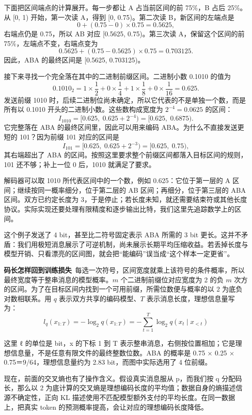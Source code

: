 下面把区间端点的计算展开。每一步都让 A 占当前区间的前 75\%，B 占后 25\%。从 {[}0, 1) 开始，第一次读 A，得到 {[}0, 0.75)。第二次读 B，新区间的左端点是
\[
0 + (0.75 - 0)\times 0.75 = 0.5625,
\]
右端点仍是 0.75，所以 AB 对应 {[}0.5625, 0.75)。第三次读 A，保留这个区间的前 75\%，左端点不变，右端点变为
\[
0.5625 + (0.75 - 0.5625)\times 0.75 = 0.703125.
\]
因此，ABA 的最终区间是 {[}0.5625, 0.703125)。

接下来寻找一个完全落在其中的二进制前缀区间。二进制小数 0.1010 的值为
\[
0.1010_2 = 1\times\frac{1}{2} + 0\times\frac{1}{4}
+ 1\times\frac{1}{8} + 0\times\frac{1}{16} = 0.625.
\]
发送前缀 1010 时，后续二进制位尚未确定，所以它代表的不是单独一个数，而是所有以 0.1010 开头的二进制小数。这些数构成宽度为 \(2^{-4}=0.0625\) 的区间：
\[
I_{1010} = [0.625,\;0.625+2^{-4}) = [0.625,\;0.6875).
\]
它完整落在 ABA 的最终区间里，因此可以用来编码 ABA。为什么不直接发送更短的 101？因为前缀 101 对应的区间是
\[
I_{101} = [0.625,\;0.625+2^{-3}) = [0.625,\;0.75),
\]
其右端超出了 ABA 的区间。按照这里要求整个前缀区间都落入目标区间的规则，101 还不够；补上一位 0 后，1010 就满足了要求。

解码器可以取 1010 所代表区间中的一个数，例如 0.625：它位于第一层的 A 区间；继续按同一概率细分，位于第二层的 AB 区间；再细分，位于第三层的 ABA 区间。双方已约定长度为 3，于是停止；若长度未知，就还需要结束符或其他长度协议。实际实现还要处理有限精度和逐步输出比特，我们这里先追踪数学上的区间。

这个例子发送了 4 bit，甚至比二符号固定表示 ABA 所需的 3 bit 更长。这并不矛盾：我们用极短消息展示了可逆机制，尚未展示长期平均压缩收益。若丢掉长度与模型开销、只看漂亮的区间图，就会把``能编码''误当成``这个样本一定更省''。

\textbf{码长怎样回到训练损失}~每选一次符号，区间宽度就乘上该符号的条件概率，所以最终宽度等于整串消息的模型概率。\(m\) 个二进制前缀位对应宽度为 2 的负 \(m\) 次方的区间。为了在目标区间内找到一个可用前缀，所需位数便与概率的以 2 为底负对数相联系。用 \(q\) 表示双方共享的编码模型、\(T\) 表示消息长度，理想信息量写为：
\[l_{q}\left( x_{1:T} \right) = - \log_{2}q\left( x_{1:T} \right) = - \sum_{t = 1}^{T}\log_{2}q\left( x_{t} \mid x_{< t} \right)\]

这里 ℓ 的单位是 bit，x 的下标 1 到 T 表示整串消息，右侧按位置相加；它是理想信息量，不是任意有限文件的最终整数位数。ABA 的概率是 0.75 × 0.25 × 0.75＝9/64，理想信息量约为 2.83 bit，而图中实际选用了 4 位前缀。

现在，前面的交叉熵也有了操作含义。假设真实消息服从 p，而我们按 q 分配码长，那么以 2 为底计算的交叉熵是理想编码长度的平均值；数据自身的熵描述信源不确定性，正向 KL 描述使用不匹配模型额外支付的平均长度。在同一数据上，把真实 token 的预测概率提高，会让对应的理想编码长度降低。

